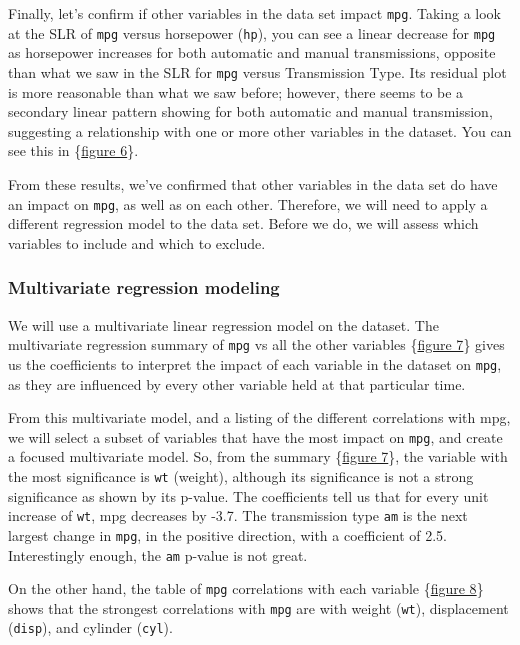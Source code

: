 \documentclass[10pt,]{article}
\begin{document}
Finally, let's confirm if other variables in the data set impact
\texttt{mpg}. Taking a look at the SLR of \texttt{mpg} versus horsepower
(\texttt{hp}), you can see a linear decrease for \texttt{mpg} as
horsepower increases for both automatic and manual transmissions,
opposite than what we saw in the SLR for \texttt{mpg} versus
Transmission Type. Its residual plot is more reasonable than what we saw
before; however, there seems to be a secondary linear pattern showing
for both automatic and manual transmission, suggesting a relationship
with one or more other variables in the dataset. You can see this in
\{\hyperref[fig6]{figure 6}\}.

From these results, we've confirmed that other variables in the data set
do have an impact on \texttt{mpg}, as well as on each other. Therefore,
we will need to apply a different regression model to the data set.
Before we do, we will assess which variables to include and which to
exclude.

\subsubsection{Multivariate regression
modeling}\label{multivariate-regression-modeling}

We will use a multivariate linear regression model on the dataset. The
multivariate regression summary of \texttt{mpg} vs all the other
variables \{\hyperref[fig7]{figure 7}\} gives us the coefficients to
interpret the impact of each variable in the dataset on \texttt{mpg}, as
they are influenced by every other variable held at that particular
time.

From this multivariate model, and a listing of the different
correlations with mpg, we will select a subset of variables that have
the most impact on \texttt{mpg}, and create a focused multivariate
model. So, from the summary \{\hyperref[fig7]{figure 7}\}, the variable
with the most significance is \texttt{wt} (weight), although its
significance is not a strong significance as shown by its p-value. The
coefficients tell us that for every unit increase of \texttt{wt}, mpg
decreases by -3.7. The transmission type \texttt{am} is the next largest
change in \texttt{mpg}, in the positive direction, with a coefficient of
2.5. Interestingly enough, the \texttt{am} p-value is not great.

On the other hand, the table of \texttt{mpg} correlations with each
variable \{\hyperref[fig8]{figure 8}\} shows that the strongest
correlations with \texttt{mpg} are with weight (\texttt{wt}),
displacement (\texttt{disp}), and cylinder (\texttt{cyl}).
\end{document}
